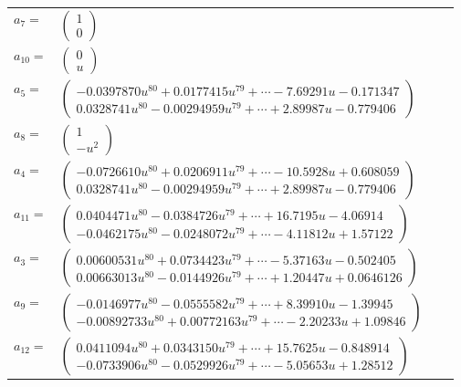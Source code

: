 \documentclass[1p]{elsarticle_modified}
\theoremstyle{definition}
\begin{document}
\begin{tabular}{m{7pt} m{180pt} m{7pt} m{180pt} }
\flushright $a_{7}=$&$\begin{pmatrix}1\\0\end{pmatrix}$ \\
\flushright $a_{10}=$&$\begin{pmatrix}0\\u\end{pmatrix}$ \\
\flushright $a_{5}=$&$\begin{pmatrix}-0.0397870 u^{80}+0.0177415 u^{79}+\cdots-7.69291 u-0.171347\\0.0328741 u^{80}-0.00294959 u^{79}+\cdots+2.89987 u-0.779406\end{pmatrix}$ \\
\flushright $a_{8}=$&$\begin{pmatrix}1\\- u^2\end{pmatrix}$ \\
\flushright $a_{4}=$&$\begin{pmatrix}-0.0726610 u^{80}+0.0206911 u^{79}+\cdots-10.5928 u+0.608059\\0.0328741 u^{80}-0.00294959 u^{79}+\cdots+2.89987 u-0.779406\end{pmatrix}$ \\
\flushright $a_{11}=$&$\begin{pmatrix}0.0404471 u^{80}-0.0384726 u^{79}+\cdots+16.7195 u-4.06914\\-0.0462175 u^{80}-0.0248072 u^{79}+\cdots-4.11812 u+1.57122\end{pmatrix}$ \\
\flushright $a_{3}=$&$\begin{pmatrix}0.00600531 u^{80}+0.0734423 u^{79}+\cdots-5.37163 u-0.502405\\0.00663013 u^{80}-0.0144926 u^{79}+\cdots+1.20447 u+0.0646126\end{pmatrix}$ \\
\flushright $a_{9}=$&$\begin{pmatrix}-0.0146977 u^{80}-0.0555582 u^{79}+\cdots+8.39910 u-1.39945\\-0.00892733 u^{80}+0.00772163 u^{79}+\cdots-2.20233 u+1.09846\end{pmatrix}$ \\
\flushright $a_{12}=$&$\begin{pmatrix}0.0411094 u^{80}+0.0343150 u^{79}+\cdots+15.7625 u-0.848914\\-0.0733906 u^{80}-0.0529926 u^{79}+\cdots-5.05653 u+1.28512\end{pmatrix}$ \\

\end{tabular}
\end{document}
